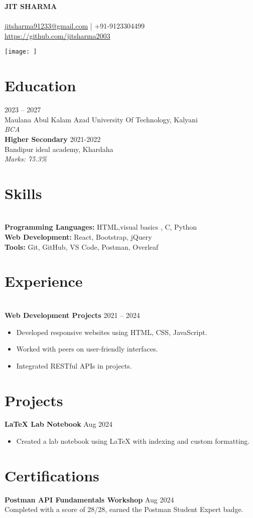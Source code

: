 ﻿\documentclass[a4paper,11pt]{article}
\makeatletter
\newcommand{\sectionuline}[1]{
    \vspace{6pt}
    \color{sectioncolor}
    \section{#1}
    \vspace{-14pt}
    \uline{\hspace{\textwidth}}
    \vspace{4pt}
    \color{black}
}
\newcommand{\header}{
    \begin{minipage}[t]{0.75\textwidth}
        \centering
        {\LARGE \textbf{JIT SHARMA}} \\ \\
        \href{mailto:arijit22112004@gmail.com}{jitsharma91233@gmail.com} | +91-9123304499 \\
        \href{https://github.com/arijit22568}{https://github.com/jitsharma2003}
    \end{minipage}%
    \begin{minipage}[t]{0.2\textwidth}
        \texttt{[image: ]} %
    \end{minipage}
}
\makeatother
\begin{document}
\header


\sectionuline{Education}


\noindent
\textbf{} \hfill 2023 -- 2027 \\
Maulana Abul Kalam Azad University Of Technology, Kalyani \\
\textit{BCA }\\


\noindent
\textbf{Higher Secondary} \hfill 2021-2022\\
Bandipur ideal academy, Khardaha\\
\textit{Marks: 75.3\%}


\sectionuline{Skills}\\
\noindent
\textbf{Programming Languages:} HTML,visual basics , C, Python \\
\textbf{Web Development:} React, Bootstrap, jQuery \\
\textbf{Tools:} Git, GitHub, VS Code, Postman, Overleaf \\


\sectionuline{Experience}\\
\noindent
\textbf{Web Development Projects} \hfill 2021 -- 2024


\begin{itemize}
    \item Developed responsive websites using HTML, CSS, JavaScript.
    \item Worked with peers on user-friendly interfaces.
    \item Integrated RESTful APIs in projects.\\
\end{itemize}
\noindent


\sectionuline{Projects}


\noindent
\textbf{LaTeX Lab Notebook} \hfill Aug 2024 


\begin{itemize}
    \item Created a lab notebook using LaTeX with indexing and custom formatting.\\
\end{itemize}


\noindent




\sectionuline{Certifications}


\noindent
\textbf{Postman API Fundamentals Workshop} \hfill Aug 2024 \\
Completed with a score of 28/28, earned the Postman Student Expert badge.
\end{document}
